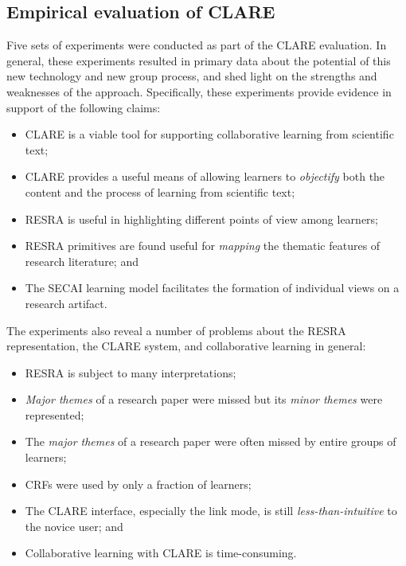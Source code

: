 \subsection{Empirical evaluation of CLARE}

Five sets of experiments were conducted as part of the CLARE evaluation.
In general, these experiments resulted in primary data about the potential
of this new technology and new group process, and shed light on the
strengths and weaknesses of the approach. Specifically, these experiments
provide evidence in support of the following claims:

\begin{itemize}
\item CLARE is a viable tool for supporting collaborative learning
  from scientific text;
  
\item CLARE provides a useful means of allowing learners to {\it objectify\/}
  both the content and the process of learning from scientific text;
  
\item RESRA is useful in highlighting different points of view among
  learners;
  
\item RESRA primitives are found useful for {\it mapping\/} the thematic
  features of research literature; and
  
\item The SECAI learning model facilitates the formation of individual
  views on a research artifact.
\end{itemize}

The experiments also reveal a number of problems about the RESRA
representation, the CLARE system, and collaborative learning in general:

\begin{itemize}
\item RESRA is subject to many interpretations;
  
\item {\it Major themes\/} of a research paper were missed but its {\it minor
  themes\/} were represented;
  
\item The {\it major themes\/} of a research paper were often missed by
  entire groups of learners;
  
\item CRFs were used by only a fraction of learners;
  
\item The CLARE interface, especially the link mode, is still
  {\it less-than-intuitive\/} to the novice user; and
  
\item Collaborative learning with CLARE is time-consuming.
\end{itemize}

